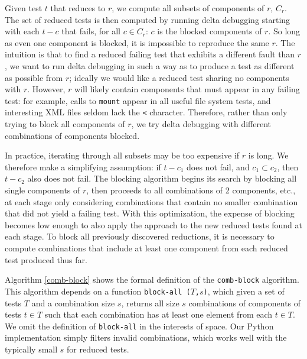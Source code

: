 Given test $t$ that reduces to $r$, we compute all subsets of
components of $r$, $C_r$.  The set of reduced tests is then computed
by running delta debugging starting with each $t-c$ that fails, for all
$c \in C_r$: $c$ is the blocked components of $r$.  So long as even
one component is blocked, it is impossible to reproduce the same $r$.
The intuition is that to find a reduced failing test that exhibits a
different fault than $r$, we want to run delta debugging in such a way
as to produce a test as different as possible from $r$; ideally we
would like a reduced test sharing no components with $r$.  However,
$r$ will likely contain components that must appear in any failing
test: for example, calls to {\tt mount} appear in all useful file
system tests, and interesting XML files seldom lack the {\tt <}
character.  Therefore, rather than only trying to block all components of $r$,
we try delta debugging with different combinations of components blocked.

In practice, iterating through all subsets may be too expensive if $r$
is long.  We therefore make a simplifying assumption:  if $t-c_1$ does not fail,
and $c_1 \subset c_2$, then $t-c_2$ also does not fail.  The blocking
algorithm begins its search by blocking all single components of $r$,
then proceeds to all combinations of 2 components, etc., at each stage
only considering combinations that contain no smaller combination that did not
yield a failing test.  With this optimization, the expense of blocking
becomes low enough to also apply the approach to the new
reduced tests found at each stage.  To block all previously discovered
reductions, it is necessary to compute combinations that include at
least one component from each reduced test produced thus far.

 Algorithm \ref{comb-block} shows
the formal definition of the {\tt comb-block} algorithm.  This algorithm depends on a
function {\tt block-all ($T$,$s$)}, which given a set of tests $T$ and
a combination size $s$,  returns all size $s$ combinations of components of tests $t
\in T$ such that each combination has at least one element
from each $t \in T$.  We omit the definition of {\tt block-all} in
the interests of space.  Our Python implementation \cite{tstl} simply
filters invalid combinations, which works well with the typically
small $s$ for reduced tests.

